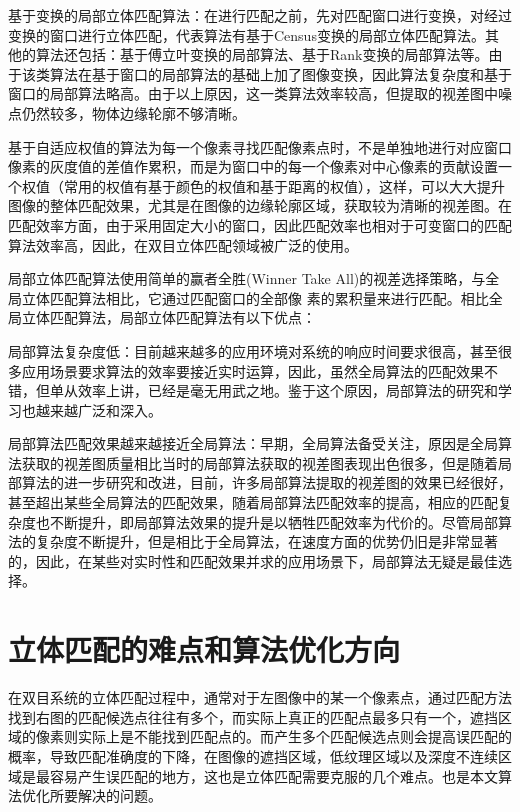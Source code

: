 基于变换的局部立体匹配算法：在进行匹配之前，先对匹配窗口进行变换，对经过变换的窗口进行立体匹配，代表算法有基于Census变换的局部立体匹配算法。其他的算法还包括：基于傅立叶变换的局部算法、基于Rank变换的局部算法等。由于该类算法在基于窗口的局部算法的基础上加了图像变换，因此算法复杂度和基于窗口的局部算法略高。由于以上原因，这一类算法效率较高，但提取的视差图中噪点仍然较多，物体边缘轮廓不够清晰。 

基于自适应权值的算法为每一个像素寻找匹配像素点时，不是单独地进行对应窗口像素的灰度值的差值作累积，而是为窗口中的每一个像素对中心像素的贡献设置一个权值（常用的权值有基于颜色的权值和基于距离的权值），这样，可以大大提升图像的整体匹配效果，尤其是在图像的边缘轮廓区域，获取较为清晰的视差图。在匹配效率方面，由于采用固定大小的窗口，因此匹配效率也相对于可变窗口的匹配算法效率高，因此，在双目立体匹配领域被广泛的使用。

局部立体匹配算法使用简单的赢者全胜(Winner Take  All)的视差选择策略，与全局立体匹配算法相比，它通过匹配窗口的全部像
素的累积量来进行匹配。相比全局立体匹配算法，局部立体匹配算法有以下优点： 

局部算法复杂度低：目前越来越多的应用环境对系统的响应时间要求很高，甚至很多应用场景要求算法的效率要接近实时运算，因此，虽然全局算法的匹配效果不错，但单从效率上讲，已经是毫无用武之地。鉴于这个原因，局部算法的研究和学习也越来越广泛和深入。 

局部算法匹配效果越来越接近全局算法：早期，全局算法备受关注，原因是全局算法获取的视差图质量相比当时的局部算法获取的视差图表现出色很多，但是随着局部算法的进一步研究和改进，目前，许多局部算法提取的视差图的效果已经很好，甚至超出某些全局算法的匹配效果，随着局部算法匹配效率的提高，相应的匹配复杂度也不断提升，即局部算法效果的提升是以牺牲匹配效率为代价的。尽管局部算法的复杂度不断提升，但是相比于全局算法，在速度方面的优势仍旧是非常显著的，因此，在某些对实时性和匹配效果并求的应用场景下，局部算法无疑是最佳选择。

\section{立体匹配的难点和算法优化方向}
在双目系统的立体匹配过程中，通常对于左图像中的某一个像素点，通过匹配方法找到右图的匹配候选点往往有多个，而实际上真正的匹配点最多只有一个，遮挡区域的像素则实际上是不能找到匹配点的。而产生多个匹配候选点则会提高误匹配的概率，导致匹配准确度的下降，在图像的遮挡区域，低纹理区域以及深度不连续区域是最容易产生误匹配的地方，这也是立体匹配需要克服的几个难点。也是本文算法优化所要解决的问题。


